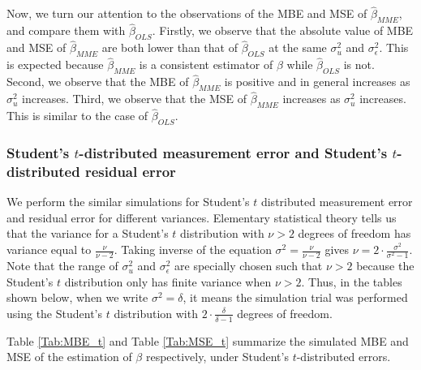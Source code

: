 \documentclass{article}
\begin{document}
Now, we turn our attention to the observations of the MBE and MSE of $\hat{\beta}_{MME}$, and compare them with $\hat{\beta}_{OLS}$.
Firstly, we observe that the absolute value of MBE and MSE of $\hat{\beta}_{MME}$ are both lower than that of $\hat{\beta}_{OLS}$ at the same $\sigma^2_u$ and $\sigma^2_\epsilon$.
This is expected because $\hat{\beta}_{MME}$ is a consistent estimator of $\beta$ while $\hat{\beta}_{OLS}$ is not.
Second, we observe that the MBE of $\hat{\beta}_{MME}$ is positive and in general increases as $\sigma^2_u$ increases.
Third, we observe that the MSE of $\hat{\beta}_{MME}$ increases as $\sigma^2_u$ increases. This is similar to the case of $\hat{\beta}_{OLS}$.

\subsubsection{Student's $t$-distributed measurement error and Student's $t$-distributed residual error}

We perform the similar simulations for Student's $t$ distributed measurement error and residual error for different variances.
Elementary statistical theory tells us that the variance for a Student's $t$ distribution with $\nu > 2$ degrees of freedom has variance equal to $\frac{\nu}{\nu-2}$.
Taking inverse of the equation $\sigma^2 = \frac{\nu}{\nu-2}$ gives $\nu = 2 \cdot \frac{\sigma^2}{\sigma^2-1}$.
Note that the range of $\sigma^2_u$ and $\sigma^2_\epsilon$ are specially chosen such that $\nu > 2$ because the Student's $t$ distribution only has finite variance when $\nu > 2$.
Thus, in the tables shown below, when we write $\sigma^2 = \delta$, it means the simulation trial was performed using the Student's $t$ distribution with $2 \cdot \frac{\delta}{\delta-1}$ degrees of freedom.

Table \ref{Tab:MBE_t} and Table \ref{Tab:MSE_t} summarize the simulated MBE and MSE of the estimation of $\beta$ respectively, under Student's $t$-distributed errors.
\end{document}
